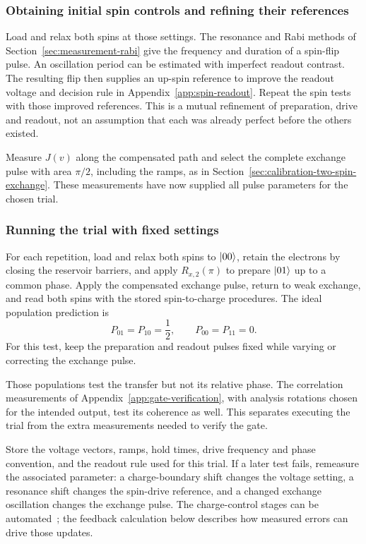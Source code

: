 \subsubsection{Obtaining initial spin controls and refining their references}
Load and relax both spins at those settings.
The resonance and Rabi methods of Section~\ref{sec:measurement-rabi}
give the frequency and duration of a spin-flip pulse.
An oscillation period can be estimated with imperfect readout contrast.
The resulting flip then supplies an up-spin reference to improve the
readout voltage and decision rule in Appendix~\ref{app:spin-readout}.
Repeat the spin tests with those improved references.
This is a mutual refinement of preparation, drive and readout, not
an assumption that each was already perfect before the others existed.

Measure $J(v)$ along the compensated path and select the complete
exchange pulse with area $\pi/2$, including the ramps, as in
Section~\ref{sec:calibration-two-spin-exchange}.
These measurements have now supplied all pulse parameters for the
chosen trial.

\subsubsection{Running the trial with fixed settings}
For each repetition, load and relax both spins to $\lvert 00\rangle$,
retain the electrons by closing the reservoir barriers, and apply
$R_{x,2}(\pi)$ to prepare $\lvert 01\rangle$ up to a common phase.
Apply the compensated exchange pulse, return to weak exchange,
and read both spins with the stored spin-to-charge procedures.
The ideal population prediction is
\[
 P_{01}=P_{10}=\frac12,\qquad P_{00}=P_{11}=0.
\]
For this test, keep the preparation and readout pulses fixed while
varying or correcting the exchange pulse.

Those populations test the transfer but not its relative phase.
The correlation measurements of
Appendix~\ref{app:gate-verification}, with analysis rotations
chosen for the intended output, test its coherence as well.
This separates executing the trial from the extra measurements
needed to verify the gate.

Store the voltage vectors, ramps, hold times, drive frequency and
phase convention, and the readout rule used for this trial.
If a later test fails, remeasure the associated parameter:
a charge-boundary shift changes the voltage setting, a resonance
shift changes the spin-drive reference, and a changed exchange
oscillation changes the exchange pulse. The charge-control stages
can be automated~\cite{Baart2016,Zubchenko2025}; the feedback
calculation below describes how measured errors can drive those
updates.

